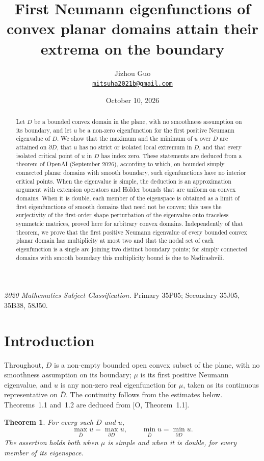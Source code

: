 \documentclass[11pt]{article}
\title{First Neumann eigenfunctions of convex planar domains attain their extrema on the boundary}
\author{Jizhou Guo\\
  \href{mailto:mitsuha2021b@gmail.com}{\texttt{mitsuha2021b@gmail.com}}}
\date{October 10, 2026}
\newtheorem{theorem}{Theorem}[section]
\theoremstyle{definition}
\theoremstyle{remark}
\numberwithin{equation}{section}
\begin{document}
\maketitle
\begin{abstract}
Let $D$ be a bounded convex domain in the plane, with no smoothness assumption on its boundary, and let $u$
be a non-zero eigenfunction for the first positive Neumann eigenvalue of $D$. We show that the maximum and
the minimum of $u$ over $\overline D$ are attained on $\partial D$, that $u$ has no strict or isolated local
extremum in $D$, and that every isolated critical point of $u$ in $D$ has index zero. These statements are
deduced from a theorem of OpenAI (September 2026), according to which, on bounded simply connected planar
domains with smooth boundary, such eigenfunctions have no interior critical points. When the eigenvalue is
simple, the deduction is an approximation argument with extension operators and H\"older bounds that are
uniform on convex domains. When it is double, each member of the eigenspace is obtained as a limit of first
eigenfunctions of smooth domains that need not be convex; this uses the surjectivity of the first-order
shape perturbation of the eigenvalue onto traceless symmetric matrices, proved here for arbitrary convex
domains. Independently of that theorem, we prove that the first positive Neumann eigenvalue of every
bounded convex planar domain has multiplicity at most two and that the nodal set of each eigenfunction is a
single arc joining two distinct boundary points; for simply connected domains with smooth boundary this
multiplicity bound is due to Nadirashvili.
\end{abstract}
\noindent\textit{2020 Mathematics Subject Classification.} Primary 35P05; Secondary 35J05, 35B38, 58J50.

\section{Introduction}\label{sec:intro}
Throughout, $D$ is a non-empty bounded open convex subset of the plane, with no smoothness assumption on its
boundary; $\mu$ is its first positive Neumann eigenvalue, and $u$ is any non-zero real eigenfunction for $\mu$,
taken as its continuous representative on $\overline D$. The continuity follows from the estimates below.
Theorems~1.1 and~1.2 are deduced from [O, Theorem~1.1].

\begin{theorem}\label{thm:boundary}
For every such $D$ and $u$,
\begin{equation}\label{eq:src-12-06}
\max_{\overline D}u=\max_{\partial D}u,\qquad
\min_{\overline D}u=\min_{\partial D}u.
\end{equation}
The assertion holds both when $\mu$ is simple and when it is double, for every member of its eigenspace.
\end{theorem}
\end{document}
